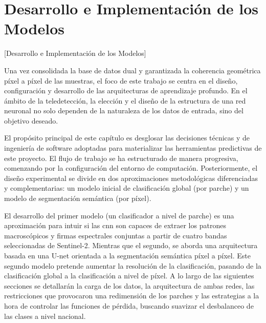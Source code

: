 \chapter{Desarrollo e Implementación de los Modelos}[Desarrollo e Implementación de los Modelos]
\label{cp:modelos}

Una vez consolidada la base de datos dual y garantizada la coherencia geométrica píxel a píxel de las muestras, el foco de este trabajo 
se centra en el diseño, configuración y desarrollo de las arquitecturas de aprendizaje profundo. En el ámbito de la teledetección, la 
elección y el diseño de la estructura de una red neuronal no solo dependen de la naturaleza de los datos de entrada, sino del objetivo 
deseado.


El propósito principal de este capítulo es desglosar las decisiones técnicas y de ingeniería de software adoptadas para materializar las 
herramientas predictivas de este proyecto. El flujo de trabajo se ha estructurado de manera progresiva, comenzando por la configuración 
del entorno de computación. Posteriormente, el diseño experimental se divide en dos aproximaciones metodológicas diferenciadas y complementarias:
un modelo inicial de clasificación global (por parche) y un modelo de segmentación semántica (por píxel).


El desarrollo del primer modelo (un clasificador a nivel de parche) es una aproximación para intuir si las \acrshort{cnn} son capaces de extraer
los patrones macroscópicos y firmas espectrales conjuntas a partir de cuatro bandas seleccionadas de Sentinel-2. Mientras que el segundo, se aborda
una arquitectura basada en una U-net orientada a la segmentación semántica píxel a píxel. Este segundo modelo pretende aumentar la resolución de 
la clasificación, pasando de la clasificación global a la clasificación a nivel de píxel. A lo largo de las siguientes secciones se detallarán
la carga de los datos, la arquitectura de ambas redes, las restricciones que provocaron una redimensión de los parches y las estrategias 
a la hora de controlar las funciones de pérdida, buscando suavizar el desbalanceo de las clases a nivel nacional. 